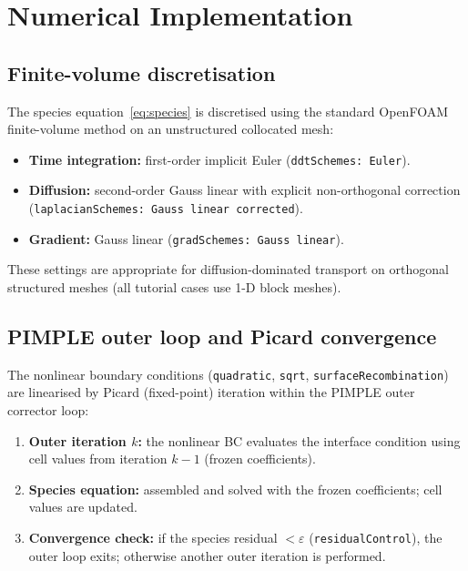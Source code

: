 \documentclass[11pt,a4paper]{article}
\begin{document}
\section{Numerical Implementation}
\label{sec:num}

\subsection{Finite-volume discretisation}

The species equation~\eqref{eq:species} is discretised using the
standard OpenFOAM finite-volume method on an unstructured collocated mesh:

\begin{itemize}[itemsep=2pt]
  \item \textbf{Time integration:} first-order implicit Euler
        (\texttt{ddtSchemes: Euler}).
  \item \textbf{Diffusion:} second-order Gauss linear with explicit non-orthogonal
        correction (\texttt{laplacianSchemes: Gauss linear corrected}).
  \item \textbf{Gradient:} Gauss linear (\texttt{gradSchemes: Gauss linear}).
\end{itemize}

These settings are appropriate for diffusion-dominated transport on
orthogonal structured meshes (all tutorial cases use 1-D block meshes).

\subsection{PIMPLE outer loop and Picard convergence}
\label{sec:pimple}

The nonlinear boundary conditions (\texttt{quadratic}, \texttt{sqrt},
\texttt{surfaceRecombination}) are linearised by Picard (fixed-point)
iteration within the PIMPLE outer corrector loop:

\begin{enumerate}[itemsep=2pt]
  \item \textbf{Outer iteration $k$:} the nonlinear BC evaluates the
        interface condition using cell values from iteration $k-1$ (frozen
        coefficients).
  \item \textbf{Species equation:} assembled and solved with the frozen
        coefficients; cell values are updated.
  \item \textbf{Convergence check:} if the species residual $< \varepsilon$
        (\texttt{residualControl}), the outer loop exits; otherwise another
        outer iteration is performed.
\end{enumerate}
\end{document}
